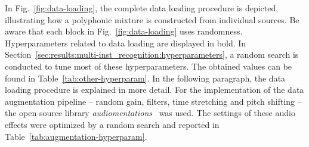 In Fig.~\ref{fig:data-loading}, the complete data loading procedure is depicted, illustrating how a polyphonic mixture is constructed from individual sources. Be aware that each block in Fig.~\ref{fig:data-loading} uses randomness. Hyperparameters related to data loading are displayed in bold. In Section~\ref{sec:results:multi-inst_recognition:hyperparameters}, a random search is conducted to tune most of these hyperparameters. The obtained values can be found in Table~\ref{tab:other-hyperparam}. In the following paragraph, the data loading procedure is explained in more detail. For the implementation of the data augmentation pipeline -- random gain, filters, time stretching and pitch shifting -- the open source library \textit{audiomentations}~\cite{audiomentations} was used. The settings of these audio effects were optimized by a random search and reported in Table~\ref{tab:augmentation-hyperparam}.\\

